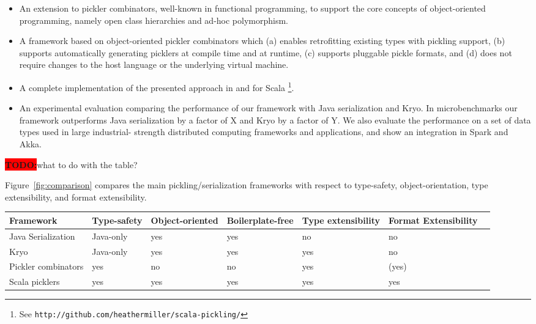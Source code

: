 \documentclass[preprint,10pt]{sigplanconf}
\theoremstyle{definition}
\newcommand{\todo}{{\bf \colorbox{red}{\color{white}TODO:}}}
\begin{document}
\begin{itemize}

\item An extension to pickler combinators, well-known in functional
programming,  to support the core concepts of object-oriented programming,
namely open class hierarchies and ad-hoc polymorphism.

\item A framework based on object-oriented pickler combinators which (a)
enables retrofitting existing types with pickling support, (b) supports
automatically generating picklers at compile time and at runtime, (c) supports
pluggable pickle formats, and (d) does not require changes to the host
language or the underlying virtual machine.

\item A complete implementation of the presented approach in and for Scala \footnote{See
    \texttt{http://github.com/heathermiller/scala-pickling/}}.

\item An experimental evaluation comparing the performance of our framework
with Java serialization and Kryo. In microbenchmarks our framework outperforms
Java serialization by a factor of X and Kryo by a factor of Y. We also
evaluate the performance on a set of data types used in large industrial-
strength distributed computing frameworks and applications, and show an
integration in Spark and Akka.

\end{itemize}

\todo what to do with the table?

Figure~\ref{fig:comparison} compares the main pickling/serialization
frameworks with respect to type-safety, object-orientation, type
extensibility, and format extensibility.

\begin{figure*}[ht!]
\centering
\begin{tabular}{|l|l|l|l|l|l|l|}
\hline
Framework           & Type-safety  & Object-oriented  & Boilerplate-free  & Type extensibility  & Format Extensibility \\
\hline
Java Serialization  & Java-only    & yes              & yes          & no                  & no \\
Kryo                & Java-only    & yes              & yes          & yes                 & no \\
Pickler combinators & yes          & no               & no           & yes                 & (yes) \\
Scala picklers      & yes          & yes              & yes          & yes                 & yes \\
\hline
\end{tabular}

\caption{Comparing serialization frameworks}\label{fig:comparison}
\end{figure*}
\end{document}
